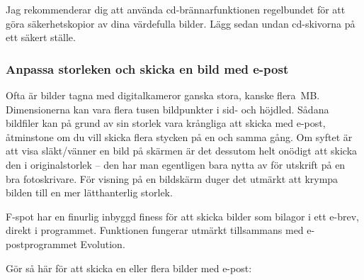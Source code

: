\documentclass[a4paper,final]{memoir} %
\begin{document}
Jag rekommenderar dig att använda cd-brännarfunktionen regelbundet för att göra säkerhetskopior av dina värdefulla bilder. Lägg sedan undan cd-skivorna på ett säkert ställe.


\subsubsection{Anpassa storleken och skicka en bild med e-post}


Ofta är bilder tagna med digitalkameror ganska stora, kanske flera~MB. Dimensionerna kan vara flera tusen bildpunkter i sid- och höjdled. Sådana bildfiler kan på grund av sin storlek vara krångliga att skicka med e-post, åtminstone om du vill skicka flera stycken på en och samma gång. Om syftet är att visa släkt/vänner en bild på skärmen är det dessutom helt onödigt att skicka den i originalstorlek -- den har man egentligen bara nytta av för utskrift på en bra fotoskrivare. För visning på en bildskärm duger det utmärkt att krympa bilden till en mer lätthanterlig storlek. 

F-spot har en finurlig inbyggd finess för att skicka bilder som bilagor i ett e-brev, direkt i programmet. Funktionen fungerar utmärkt tillsammans med e-postprogrammet Evolution.

Gör så här för att skicka en eller flera bilder med e-post:
\end{document}
